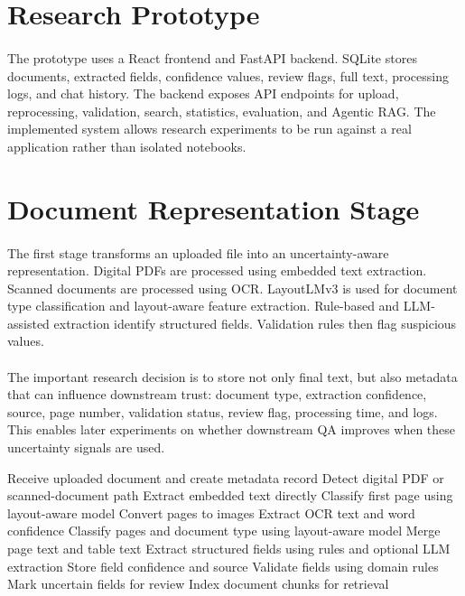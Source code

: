 \section{Research Prototype}
\paragraph{} The prototype uses a React frontend and FastAPI backend. SQLite stores documents, extracted fields, confidence values, review flags, full text, processing logs, and chat history. The backend exposes API endpoints for upload, reprocessing, validation, search, statistics, evaluation, and Agentic RAG. The implemented system allows research experiments to be run against a real application rather than isolated notebooks.

\section{Document Representation Stage}
\paragraph{} The first stage transforms an uploaded file into an uncertainty-aware representation. Digital PDFs are processed using embedded text extraction. Scanned documents are processed using OCR. LayoutLMv3 is used for document type classification and layout-aware feature extraction. Rule-based and LLM-assisted extraction identify structured fields. Validation rules then flag suspicious values.

\paragraph{} The important research decision is to store not only final text, but also metadata that can influence downstream trust: document type, extraction confidence, source, page number, validation status, review flag, processing time, and logs. This enables later experiments on whether downstream QA improves when these uncertainty signals are used.

\begin{algorithm}[h]
\caption{Uncertainty-Aware Document Representation}
\label{alg:document_pipeline}
\begin{algorithmic}[1]
\State Receive uploaded document and create metadata record
\State Detect digital PDF or scanned-document path
    \State Extract embedded text directly
    \State Classify first page using layout-aware model
\Else
    \State Convert pages to images
    \State Extract OCR text and word confidence
    \State Classify pages and document type using layout-aware model
\EndIf
\State Merge page text and table text
\State Extract structured fields using rules and optional LLM extraction
\State Store field confidence and source
\State Validate fields using domain rules
\State Mark uncertain fields for review
\State Index document chunks for retrieval
\end{algorithmic}
\end{algorithm}

